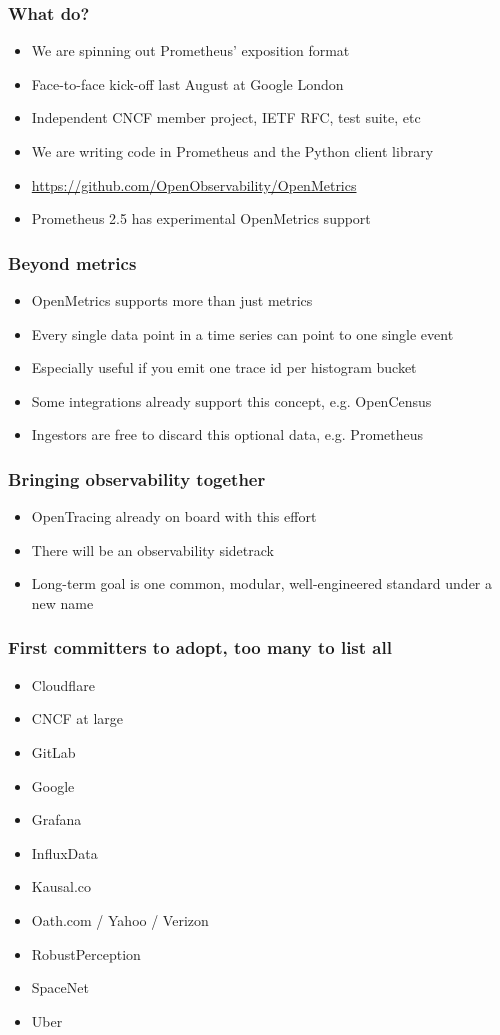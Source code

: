 \documentclass[aspectratio=169]{beamer}
\begin{document}
\begin{frame}
	\frametitle{What do?}
	\begin{itemize}
		\item We are spinning out Prometheus' exposition format
		\item Face-to-face kick-off last August at Google London
		\item Independent CNCF member project, IETF RFC, test suite, etc
		\item We are writing code in Prometheus and the Python client library
		\item \url{https://github.com/OpenObservability/OpenMetrics}
		\item Prometheus 2.5 has experimental OpenMetrics support
	\end{itemize}
\end{frame}

\begin{frame}
	\frametitle{Beyond metrics}
	\begin{itemize}
		\item OpenMetrics supports more than just metrics
		\item Every single data point in a time series can point to one single event
		\item Especially useful if you emit one trace id per histogram bucket
		\item Some integrations already support this concept, e.g. OpenCensus
		\item Ingestors are free to discard this optional data, e.g. Prometheus
	\end{itemize}
\end{frame}

\begin{frame}
	\frametitle{Bringing observability together}
	\begin{itemize}
		\item OpenTracing already on board with this effort
		\item There will be an observability sidetrack
		\item Long-term goal is one common, modular, well-engineered standard under a new name
	\end{itemize}
\end{frame}



\begin{frame}
	\frametitle{First committers to adopt, too many to list all}
	\begin{itemize}
		\item Cloudflare
		\item CNCF at large
		\item GitLab
		\item Google
		\item Grafana
		\item InfluxData
		\item Kausal.co
		\item Oath.com / Yahoo / Verizon
		\item RobustPerception
		\item SpaceNet
		\item Uber
	\end{itemize}
\end{frame}
\end{document}
